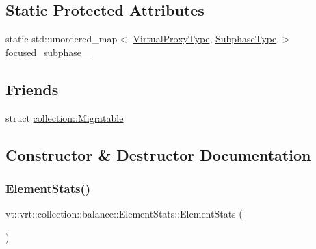 \subsection*{Static Protected Attributes}
\begin{DoxyCompactItemize}
\item 
static std\+::unordered\+\_\+map$<$ \hyperlink{namespacevt_a1b417dd5d684f045bb58a0ede70045ac}{Virtual\+Proxy\+Type}, \hyperlink{namespacevt_ae78cbfdf1e57470e33eedb074f2beeba}{Subphase\+Type} $>$ \hyperlink{structvt_1_1vrt_1_1collection_1_1balance_1_1_element_stats_aed2a4fb4fbcf36bf6a392907fcfb1791}{focused\+\_\+subphase\+\_\+}
\end{DoxyCompactItemize}
\subsection*{Friends}
\begin{DoxyCompactItemize}
\item 
struct \hyperlink{structvt_1_1vrt_1_1collection_1_1balance_1_1_element_stats_ad16bcfc5db0df5769bebcb8888c723d0}{collection\+::\+Migratable}
\end{DoxyCompactItemize}


\subsection{Constructor \& Destructor Documentation}
\mbox{\label{structvt_1_1vrt_1_1collection_1_1balance_1_1_element_stats_a4d88e9b2f7981d7f98889fa9bea01d73}} 
\subsubsection{\texorpdfstring{Element\+Stats()}{ElementStats()}\hspace{0.1cm}{\footnotesize\ttfamily [1/3]}}
{\footnotesize\ttfamily vt\+::vrt\+::collection\+::balance\+::\+Element\+Stats\+::\+Element\+Stats (\begin{DoxyParamCaption}{ }\end{DoxyParamCaption})\hspace{0.3cm}{\ttfamily [default]}}


